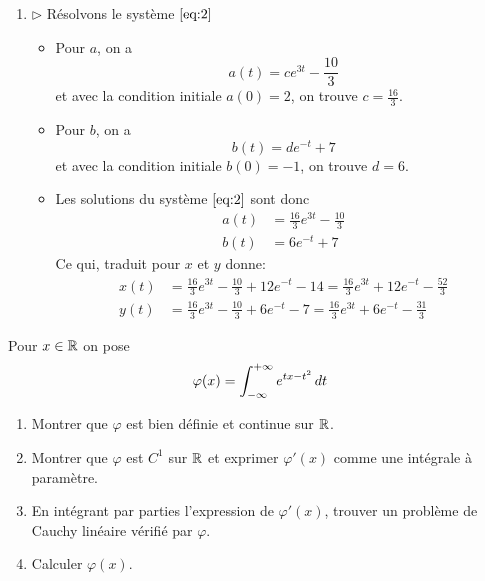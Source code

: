 {\begin{nntd-sol}[]
\begin{enumerate}
			\item \(\triangleright\) Résolvons le système \(\eqref{eq:2}\)
			\begin{itemize}
				\item Pour \(a\), on a 
				\begin{equation*}
					a(t)=c e^{3t}-\frac{10}3
				\end{equation*}
				et avec la condition initiale \(a(0)=2\), on trouve \(c=\frac{16}3\).

				\item Pour \(b\), on a
				\begin{equation*}
					b(t)=d e^{-t}+7
				\end{equation*}
				et avec la condition initiale \(b(0)=-1\), on trouve \(d=6\).

				\item Les solutions du système \(\eqref{eq:2}\) sont donc
				\begin{equation*}
					\begin{aligned}
						a(t)&=\frac{16}3 e^{3t}-\frac{10}3\\
						b(t)&=6 e^{-t}+7
					\end{aligned}
				\end{equation*}
				Ce qui, traduit pour \(x\) et \(y\) donne:
				\begin{equation*}
					\begin{aligned}
						x(t)&=\frac{16}3 e^{3t}-\frac{10}3+ 12 e^{-t}-14=\frac{16}3 e^{3t}+12 e^{-t}-\frac{52}3\\
						y(t)&=\frac{16}3 e^{3t}-\frac{10}3+ 6 e^{-t}-7=\frac{16}3 e^{3t}+6 e^{-t}-\frac{31}3
					\end{aligned}
				\end{equation*}
			\end{itemize}
		\end{enumerate}
	\end{nntd-sol}
}{}

\begin{td-exo}[] %
	Pour \(x\in\mathbb{R}\) on pose
	\begin{equation*}
		\varphi(x)=\int_{-\infty}^{+\infty}e^{tx-t^2}\mathop{}\!{d} t
	\end{equation*}

	\begin{enumerate}
		\item Montrer que \(\varphi\) est bien définie et continue sur \(\mathbb{R}\).
		\item Montrer que \(\varphi\) est \(C^1\) sur \(\mathbb{R}\) et exprimer 
		\(\varphi'(x)\) comme une intégrale à paramètre.
		\item En intégrant par parties l'expression de \(\varphi'(x)\), trouver
		un problème de Cauchy linéaire vérifié par \(\varphi\).
		\item Calculer \(\varphi(x)\).
	\end{enumerate}

\end{td-exo}


